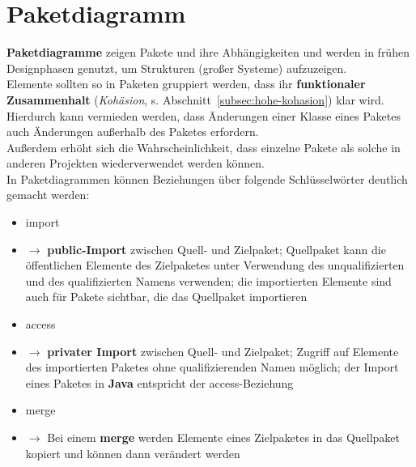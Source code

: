 \section{Paketdiagramm}

\begin{tcolorbox}[title=Komposition]
    \textbf{Paketdiagramme} zeigen Pakete und ihre Abhängigkeiten und werden in frühen Designphasen genutzt, um Strukturen (großer Systeme) aufzuzeigen.\\

    \noindent
    Elemente sollten so in Paketen gruppiert werden, dass ihr \textbf{funktionaler Zusammenhalt} (\textit{Kohäsion}, s. Abschnitt~\ref{subsec:hohe-kohasion}) klar wird.\\
    Hierdurch kann vermieden werden, dass Änderungen einer Klasse eines Paketes auch Änderungen außerhalb des Paketes erfordern.\\
    Außerdem erhöht sich die Wahrscheinlichkeit, dass einzelne Pakete als solche in anderen Projekten wiederverwendet werden können.\\

    \noindent
    In Paketdiagrammen können Beziehungen über folgende Schlüsselwörter deutlich gemacht werden:

    \begin{itemize}
        \item \guillemotleft import\guillemotright
        \item[] $\rightarrow$ \textbf{public-Import} zwischen Quell- und Zielpaket; Quellpaket kann die öffentlichen Elemente des Zielpaketes unter Verwendung des unqualifizierten und des qualifizierten Namens verwenden; die importierten Elemente sind auch für Pakete sichtbar, die das Quellpaket importieren
        \item \guillemotleft access\guillemotright
        \item[] $\rightarrow$ \textbf{privater Import} zwischen Quell- und Zielpaket; Zugriff auf Elemente des importierten Paketes ohne qualifizierenden Namen möglich; der Import eines Paketes in \textbf{Java} entspricht der \guillemotleft access\guillemotright-Beziehung
        \item \guillemotleft merge\guillemotright
        \item[] $\rightarrow$ Bei einem \textbf{merge} werden Elemente eines Zielpaketes in das Quellpaket kopiert und können dann verändert werden
   \end{itemize}
\end{tcolorbox}